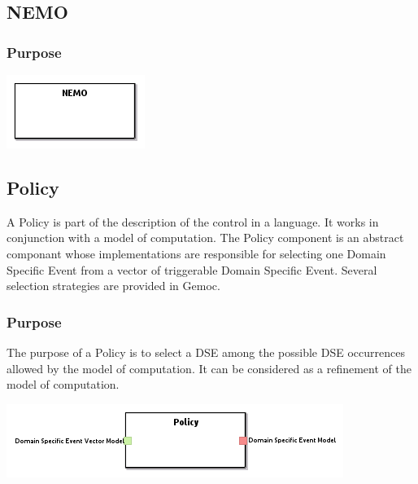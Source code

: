 \documentclass{gemoc} %
\begin{document}
\subsection{NEMO}


\subsubsection{Purpose}


\begin{center}
\includegraphics*[trim=0.0cm 0.0cm 0cm 0.0cm, clip=true]{../images/generated/Generated_NEMO.png}
\end{center}




\subsection{Policy}
A Policy is part of the description of the control in a language. It works in conjunction with a model of computation.
The Policy component is an abstract componant whose implementations are responsible for selecting one Domain Specific Event from a vector of triggerable Domain Specific Event. Several selection strategies are provided in Gemoc.

\subsubsection{Purpose}
The purpose of a Policy is to select a DSE among the possible DSE occurrences allowed by the model of computation. It can be considered as a refinement of the model of computation.

\begin{center}
\includegraphics*[trim=0.0cm 0.0cm 0cm 0.0cm, clip=true]{../images/generated/Generated_Policy.png}
\end{center}
\end{document}
